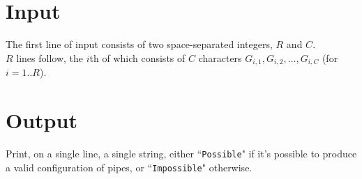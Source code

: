 \section*{Input}
The first line of input consists of two space-separated integers, $R$ and $C$.\\
$R$ lines follow, the $i$th of which consists of $C$ characters $G_{i,1}, G_{i,2}, \dots, G_{i,C}$ (for $i = 1..R$).

\section*{Output}
Print, on a single line, a single string, either ``\texttt{Possible}" if it's possible to produce a valid configuration of pipes, or ``\texttt{Impossible}" otherwise.\\
